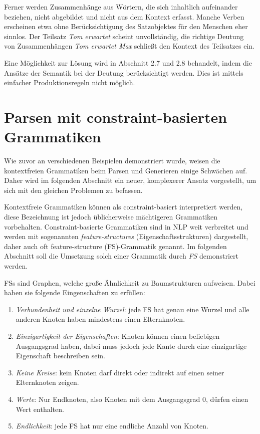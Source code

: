 \documentclass[12pt]{report}
\begin{document}
Ferner werden Zusammenhänge aus Wörtern, die sich inhaltlich aufeinander beziehen, nicht abgebildet und nicht aus dem Kontext erfasst. Manche Verben erscheinen etwa ohne Berücksichtigung des Satzobjektes für den Menschen eher sinnlos. Der Teilsatz \textit{\glqq  Tom erwartet\grqq{}} scheint unvollständig, die richtige Deutung von Zusammenhängen \textit{\glqq  Tom erwartet Max\grqq{}} schließt den Kontext des Teilsatzes ein.

Eine Möglichkeit zur Lösung wird in Abschnitt 2.7 und 2.8 behandelt, indem die Ansätze der Semantik bei der Deutung berücksichtigt werden. Dies ist mittels einfacher Produktionsregeln nicht möglich.

\section[Parsen mit CBGs]{Parsen mit constraint-basierten \\Grammatiken}
Wie zuvor an verschiedenen Beispielen demonstriert wurde, weisen die kontextfreien Grammatiken beim Parsen und Generieren einige Schwächen auf. Daher wird im folgenden Abschnitt ein neuer, komplexerer Ansatz vorgestellt, um sich mit den gleichen Problemen zu befassen. 

Kontextfreie Grammatiken können als constraint-basiert interpretiert werden, diese Bezeichnung ist jedoch üblicherweise mächtigeren Grammatiken vorbehalten. Constraint-basierte Grammatiken sind in NLP weit verbreitet und werden mit sogenannten \textit{feature-structures} (Eigenschaftsstrukturen) dargestellt, daher auch oft feature-structure (FS)-Grammatik genannt. Im folgenden Abschnitt soll die Umsetzung solch einer Grammatik durch \textit{FS} demonstriert werden.

FSs sind Graphen, welche große Ähnlichkeit zu Baumstrukturen aufweisen. Dabei haben sie folgende Eingenschaften zu erfüllen:

\begin{enumerate}
\item \textit{Verbundenheit und einzelne Wurzel}: jede FS hat genau eine Wurzel und alle anderen Knoten haben mindestens einen Elternknoten.
\item \textit{Einzigartigkeit der Eigenschaften}: Knoten können einen beliebigen Ausgangsgrad haben, dabei muss jedoch jede Kante durch eine einzigartige Eigenschaft beschreiben sein.
\item \textit{Keine Kreise}: kein Knoten darf direkt oder indirekt auf einen seiner Elternknoten zeigen. 
\item \textit{Werte}: Nur Endknoten, also Knoten mit dem Ausgangsgrad 0, dürfen einen Wert enthalten. 
\item \textit{Endlichkeit}: jede FS hat nur eine endliche Anzahl von Knoten.
\end{enumerate}
\end{document}
